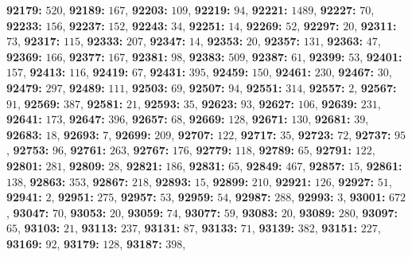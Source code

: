 \textsf{\bfseries 92179:} $520$, \textsf{\bfseries 92189:} $167$, \textsf{\bfseries 92203:} $109$, \textsf{\bfseries 92219:} $94$, \textsf{\bfseries 92221:} $1489$, \textsf{\bfseries 92227:} $70$, \textsf{\bfseries 92233:} $156$, \textsf{\bfseries 92237:} $152$, \textsf{\bfseries 92243:} $34$, \textsf{\bfseries 92251:} $14$, \textsf{\bfseries 92269:} $52$, \textsf{\bfseries 92297:} $20$, \textsf{\bfseries 92311:} $73$, \textsf{\bfseries 92317:} $115$, \textsf{\bfseries 92333:} $207$, \textsf{\bfseries 92347:} $14$, \textsf{\bfseries 92353:} $20$, \textsf{\bfseries 92357:} $131$, \textsf{\bfseries 92363:} $47$, \textsf{\bfseries 92369:} $166$, \textsf{\bfseries 92377:} $167$, \textsf{\bfseries 92381:} $98$, \textsf{\bfseries 92383:} $509$, \textsf{\bfseries 92387:} $61$, \textsf{\bfseries 92399:} $53$, \textsf{\bfseries 92401:} $157$, \textsf{\bfseries 92413:} $116$, \textsf{\bfseries 92419:} $67$, \textsf{\bfseries 92431:} $395$, \textsf{\bfseries 92459:} $150$, \textsf{\bfseries 92461:} $230$, \textsf{\bfseries 92467:} $30$, \textsf{\bfseries 92479:} $297$, \textsf{\bfseries 92489:} $111$, \textsf{\bfseries 92503:} $69$, \textsf{\bfseries 92507:} $94$, \textsf{\bfseries 92551:} $314$, \textsf{\bfseries 92557:} $2$, \textsf{\bfseries 92567:} $91$, \textsf{\bfseries 92569:} $387$, \textsf{\bfseries 92581:} $21$, \textsf{\bfseries 92593:} $35$, \textsf{\bfseries 92623:} $93$, \textsf{\bfseries 92627:} $106$, \textsf{\bfseries 92639:} $231$, \textsf{\bfseries 92641:} $173$, \textsf{\bfseries 92647:} $396$, \textsf{\bfseries 92657:} $68$, \textsf{\bfseries 92669:} $128$, \textsf{\bfseries 92671:} $130$, \textsf{\bfseries 92681:} $39$, \textsf{\bfseries 92683:} $18$, \textsf{\bfseries 92693:} $7$, \textsf{\bfseries 92699:} $209$, \textsf{\bfseries 92707:} $122$, \textsf{\bfseries 92717:} $35$, \textsf{\bfseries 92723:} $72$, \textsf{\bfseries 92737:} $95$, \textsf{\bfseries 92753:} $96$, \textsf{\bfseries 92761:} $263$, \textsf{\bfseries 92767:} $176$, \textsf{\bfseries 92779:} $118$, \textsf{\bfseries 92789:} $65$, \textsf{\bfseries 92791:} $122$, \textsf{\bfseries 92801:} $281$, \textsf{\bfseries 92809:} $28$, \textsf{\bfseries 92821:} $186$, \textsf{\bfseries 92831:} $65$, \textsf{\bfseries 92849:} $467$, \textsf{\bfseries 92857:} $15$, \textsf{\bfseries 92861:} $138$, \textsf{\bfseries 92863:} $353$, \textsf{\bfseries 92867:} $218$, \textsf{\bfseries 92893:} $15$, \textsf{\bfseries 92899:} $210$, \textsf{\bfseries 92921:} $126$, \textsf{\bfseries 92927:} $51$, \textsf{\bfseries 92941:} $2$, \textsf{\bfseries 92951:} $275$, \textsf{\bfseries 92957:} $53$, \textsf{\bfseries 92959:} $54$, \textsf{\bfseries 92987:} $288$, \textsf{\bfseries 92993:} $3$, \textsf{\bfseries 93001:} $672$, \textsf{\bfseries 93047:} $70$, \textsf{\bfseries 93053:} $20$, \textsf{\bfseries 93059:} $74$, \textsf{\bfseries 93077:} $59$, \textsf{\bfseries 93083:} $20$, \textsf{\bfseries 93089:} $280$, \textsf{\bfseries 93097:} $65$, \textsf{\bfseries 93103:} $21$, \textsf{\bfseries 93113:} $237$, \textsf{\bfseries 93131:} $87$, \textsf{\bfseries 93133:} $71$, \textsf{\bfseries 93139:} $382$, \textsf{\bfseries 93151:} $227$, \textsf{\bfseries 93169:} $92$, \textsf{\bfseries 93179:} $128$, \textsf{\bfseries 93187:} $398$, 

